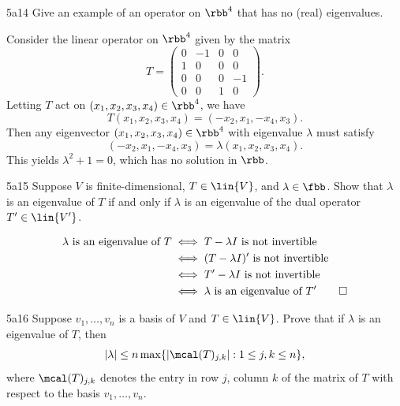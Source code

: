 \begin{exercise}{5a14}
    Give an example of an operator on $\rbb^4$ that has no (real) eigenvalues.
\end{exercise}

\begin{sol}
    Consider the linear operator on $\rbb^4$ given by the matrix
    \[
        T = 
        \begin{pmatrix}
            0 & -1 & 0 & 0 \\
            1 & 0 & 0 & 0 \\
            0 & 0 & 0 & -1 \\
            0 & 0 & 1 & 0
        \end{pmatrix}.
    \]
    Letting $T$ act on $(x_1, x_2, x_3, x_4) \in \rbb^4$, we have
    \[
    	T(x_1, x_2, x_3, x_4) = (-x_2, x_1, -x_4, x_3).
    \]
    Then any eigenvector $(x_1, x_2, x_3, x_4) \in \rbb^4$ with eigenvalue $\lambda$ must satisfy
    \[
    	(-x_2, x_1, -x_4, x_3) = \lambda (x_1, x_2, x_3, x_4).
    \]
    This yields $\lambda^2 + 1 = 0$, which has no solution in $\rbb$.
\end{sol}

\begin{exercise}{5a15}
    Suppose $V$ is finite-dimensional, $T \in \lin{V}$, and $\lambda \in \fbb$.
	Show that $\lambda$ is an eigenvalue of $T$ if and only if $\lambda$ is an eigenvalue of the dual operator $T' \in \lin{V'}$.
\end{exercise}

\begin{sol}
    \begin{align*}
        \lambda \text{ is an eigenvalue of } T & \iff T-\lambda I \text{ is not invertible} \\ 
        & \iff (T-\lambda I)' \text{ is not invertible} \\ 
        & \iff T'-\lambda I \text{ is not invertible} \\ 
        & \iff \lambda \text{ is an eigenvalue of } T' \qedhere
    \end{align*}
\end{sol}

\begin{exercise}{5a16}
    Suppose $v_1, \ldots, v_n$ is a basis of $V$ and $T \in \lin{V}$.
	Prove that if $\lambda$ is an eigenvalue of $T$, then
    \[
    	|\lambda| \leq n \max\{|\mcal(T)_{j, k}| : 1 \leq j, k \leq n\},
    \]
    where $\mcal(T)_{j, k}$ denotes the entry in row $j$, column $k$ of the matrix of $T$ with respect to the basis $v_1, \ldots, v_n$.
    
\end{exercise}

